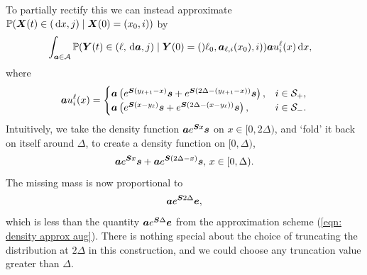 
To partially rectify this we can instead approximate \(\mathbb P(\boldsymbol X(t)\in (\, \mathrm{d} x, j)\mid \boldsymbol X(0)=(x_0, i)) \) by
\begin{align}
	\label{eqn: density approx 3+}&
	\displaystyle\int_{\boldsymbol a \in\mathcal A}\mathbb P(\boldsymbol Y(t) \in(\ell, \, \mathrm{d} \boldsymbol a, j)\mid \boldsymbol Y(0)=()\ell_0, \boldsymbol  a_{\ell,i}(x_0), i)) \boldsymbol a u_i^\ell(x) \, \mathrm{d} x ,
\end{align}
{where}
\begin{align}
		\boldsymbol a u_i^\ell(x) = \begin{cases}
			\boldsymbol a \left(e^{ \boldsymbol{S}(y_{\ell+1}-x)} \boldsymbol s + e^{ \boldsymbol{S}(2\Delta-(y_{\ell+1}-x))} \boldsymbol s\right), & i\in\mathcal{S}_+, \\ 
			\boldsymbol a \left(e^{ \boldsymbol{S}(x-y_\ell)} \boldsymbol s+e^{ \boldsymbol{S}(2\Delta-(x-y_\ell))} \boldsymbol s\right), & i\in\mathcal{S}_-. \\ 
		\end{cases}\label{eqn: density approx 3+a}
\end{align}
Intuitively, we take the density function \(\boldsymbol ae^{\boldsymbol{S}x}\boldsymbol s\) on \(x \in [0,2\Delta)\), and `fold' it back on itself around \(\Delta\), to create a density function on \([0,\Delta)\), 
\[\boldsymbol ae^{\boldsymbol{S}x}\boldsymbol s +\boldsymbol ae^{\boldsymbol{S}(2\Delta-x)}\boldsymbol s,\, x \in [0,\Delta).\]
The missing mass is now proportional to 
\[\boldsymbol a e^{\boldsymbol S 2\Delta}\boldsymbol e,\]
which is less than the quantity \(\boldsymbol a e^{\boldsymbol S \Delta}\boldsymbol e\) from the approximation scheme (\ref{eqn: density approx aug}). There is nothing special about the choice of truncating the distribution at \(2\Delta\) in this construction, and we could choose any truncation value greater than \(\Delta\).

